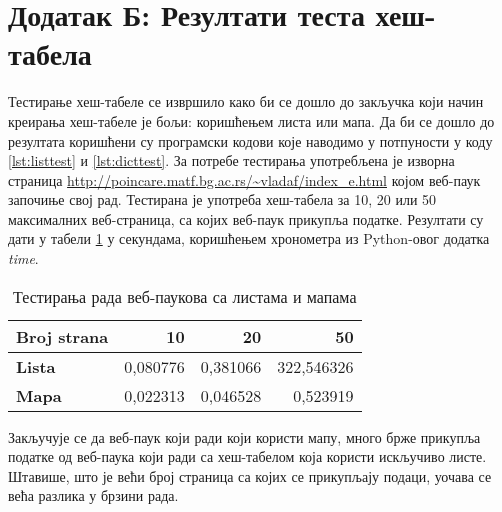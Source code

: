 \section{Додатак Б: Резултати теста хеш-табела}\label{sec:dodatakb}

Тестирање хеш-табеле се извршило како би се дошло до закључка који начин
креирања хеш-табеле је бољи: коришћењем листа или мапа. Да би се дошло до
резултата коришћени су програмски кодови које наводимо у потпуности у коду \ref{lst:listtest} и \ref{lst:dicttest}.
За потребе тестирања употребљена је изворна страница \url{http://poincare.matf.bg.ac.rs/~vladaf/index_e.html}
којом веб-паук започиње свој рад.
Тестирана је употреба хеш-табела за 10, 20 или 50 максималних
веб-страница, са којих веб-паук прикупља податке. Резултати су дати у табели \ref{tabele:list-dict}
у секундама, коришћењем хронометра из Python-овог додатка \emph{time}.

\lstset{numbers=left}


\lstset{numbers=left}


\begin{table}[h]
\centering
\begin{tabular}{|l|r|r|r|} \hline
\textbf{Broj strana} & 10 & 20 & 50\\ \hline
\textbf{Lista} & 0,080776 & 0,381066 & 322,546326\\ \hline
\textbf{Mapa} & 0,022313 & 0,046528 & 0,523919\\ \hline
\end{tabular}
\caption{Тестирања рада веб-паукова са листама и мапама}
\label{tabele:list-dict}
\end{table}

Закључује се да веб-паук који ради који користи мапу, много брже прикупља
податке од веб-паука који ради са хеш-табелом која користи искључиво листе.
Штавише, што је већи број страница са којих се прикупљају подаци,
уочава се већа разлика у брзини рада.
